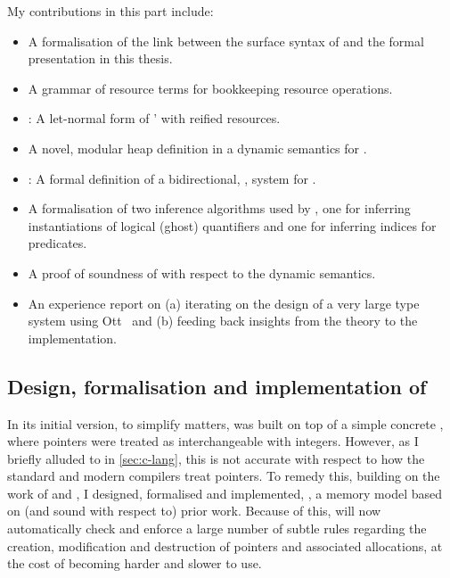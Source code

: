 My contributions in this part include:
\begin{itemize}
    \item A formalisation of the link between the surface syntax of  and
        the formal presentation in this thesis.
    \item A grammar of resource terms for bookkeeping resource operations.
    \item {}: A let-normal form of '  with
        reified resources.
    \item A novel, modular heap definition in a dynamic semantics for .
    \item {}: A formal definition of a bidirectional,
        ,  system for .
    \item A formalisation of two inference algorithms used by , one for inferring
        instantiations of logical (ghost) quantifiers and one for inferring
        indices for  predicates.
    \item A proof of soundness of  with respect to the
         dynamic semantics.
    \item An experience report on (a) iterating on the design of a very large type
        system using Ott~ and (b) feeding back insights
        from the theory to the implementation.
\end{itemize}

\subsection{Design, formalisation and implementation of }

In its initial version, to simplify matters,  was built on top of a
simple concrete , where pointers were treated as
interchangeable with integers. However, as I briefly alluded to in
\cref{sec:c-lang}, this is not accurate with respect to how the standard and
modern compilers treat pointers. To remedy this, building on the work of
 and , I
designed, formalised and implemented, , a memory model based on
(and sound with respect to) prior work. Because of this,  will now
automatically check and enforce a large number of subtle rules regarding the
creation, modification and destruction of pointers and associated allocations,
at the cost of  becoming harder and slower to use.


